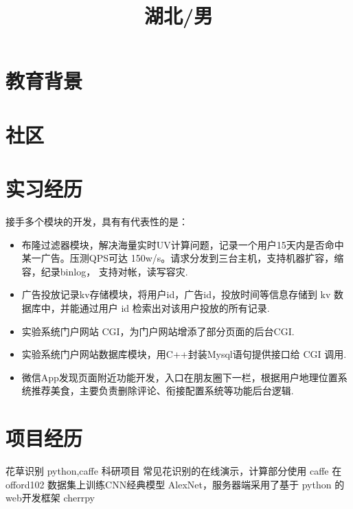 \documentclass[14pt,a4paper]{moderncv}
\title{\textbf{湖北/男}}
\begin{document}
\maketitle
\vspace{-3em}      %

\section{\textbf{教育背景}}
\vspace{-1em}

\section{\textbf{社区}}
\vspace{-1em}      %

\section{\textbf{实习经历}}
{接手多个模块的开发，具有有代表性的是：
\begin{itemize}
\item 布隆过滤器模块，解决海量实时UV计算问题，记录一个用户15天内是否命中某一广告。压测QPS可达 150w/s。请求分发到三台主机，支持机器扩容，缩容，纪录binlog， 支持对帐，读写容灾.
\item 广告投放记录kv存储模块，将用户id，广告id，投放时间等信息存储到 kv 数据库中，并能通过用户 id 检索出对该用户投放的所有记录.
\item 实验系统门户网站 CGI，为门户网站增添了部分页面的后台CGI.
\item 实验系统门户网站数据库模块，用C++封装Mysql语句提供接口给 CGI 调用.
\item 微信App发现页面附近功能开发，入口在朋友圈下一栏，根据用户地理位置系统推荐美食，主要负责删除评论、衔接配置系统等功能后台逻辑.
\end{itemize}
}

\section{\textbf{项目经历}}
{花草识别}
{python,caffe}
{科研项目}{}
{常见花识别的在线演示，计算部分使用 caffe 在 offord102 数据集上训练CNN经典模型 AlexNet，服务器端采用了基于 python 的 web开发框架 cherrpy}
\end{document}
